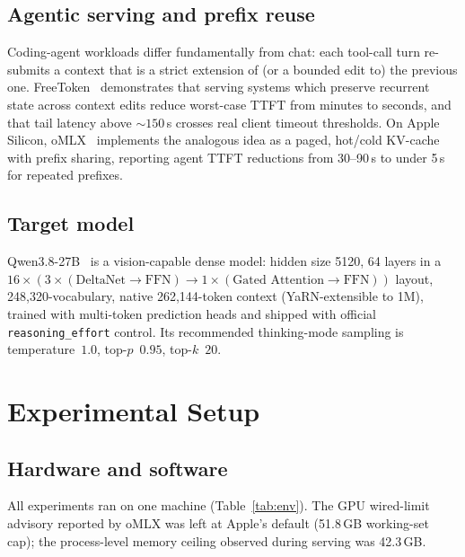 \documentclass[11pt]{article}
\newcommand{\omlx}{oMLX}
\begin{document}
\subsection{Agentic serving and prefix reuse}
Coding-agent workloads differ fundamentally from chat: each tool-call turn
re-submits a context that is a strict extension of (or a bounded edit to) the
previous one. FreeToken~\cite{freetoken} demonstrates that serving systems
which preserve recurrent state across context edits reduce worst-case TTFT from
minutes to seconds, and that tail latency above ${\sim}150$\,s crosses real
client timeout thresholds. On Apple Silicon, \omlx{}~\cite{omlx} implements the
analogous idea as a paged, hot/cold KV-cache with prefix sharing, reporting
agent TTFT reductions from 30--90\,s to under 5\,s for repeated prefixes.

\subsection{Target model}
Qwen3.8-27B~\cite{qwen38} is a vision-capable dense model: hidden size 5120,
64 layers in a $16\times(3\times(\text{DeltaNet}\!\to\!\text{FFN}) \to
1\times(\text{Gated Attention}\!\to\!\text{FFN}))$ layout, 248{,}320-vocabulary,
native 262{,}144-token context (YaRN-extensible to 1M), trained with multi-token
prediction heads and shipped with official \texttt{reasoning\_effort} control.
Its recommended thinking-mode sampling is temperature~$1.0$, top-$p$~$0.95$,
top-$k$~$20$.

\section{Experimental Setup}
\label{sec:method}

\subsection{Hardware and software}
All experiments ran on one machine (Table~\ref{tab:env}). The GPU wired-limit
advisory reported by \omlx{} was left at Apple's default (51.8\,GB working-set
cap); the process-level memory ceiling observed during serving was 42.3\,GB.
\end{document}

